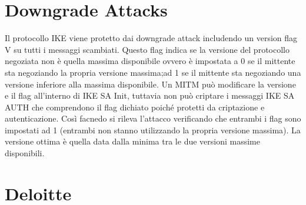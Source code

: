 \documentclass{article}
\begin{document}
\section{Downgrade Attacks}
Il protocollo IKE viene protetto dai downgrade attack includendo un version flag V su tutti i messaggi scambiati\@. Questo flag indica se la versione del protocollo negoziata non è quella massima disponibile ovvero è impostata a 0 se il mittente sta negoziando la propria versione massima;\@altrimenti ad 1 se il mittente sta negoziando una versione inferiore alla massima disponibile\@.\newline
Un MITM può modificare la versione e il flag all'interno di IKE SA Init, tuttavia non può criptare i messaggi IKE SA AUTH che comprendono il flag dichiato poiché protetti da criptazione e autenticazione\@. Così facnedo si rileva l'attacco verificando che entrambi i flag sono impostati ad 1 (entrambi non stanno utilizzando la propria versione massima)\@.\newline
La versione ottima è quella data dalla minima tra le due versioni massime disponibili\@.

\section{Deloitte}
\end{document}
